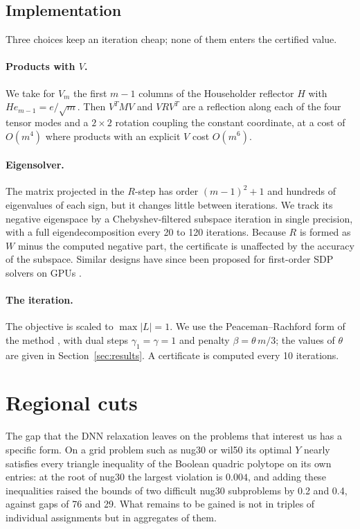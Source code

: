 \documentclass[11pt]{article}
\theoremstyle{remark}
\begin{document}
\subsection{Implementation}\label{sec:impl}

Three choices keep an iteration cheap; none of them enters the certified value.

\paragraph{Products with $V$.} We take for $V_m$ the first $m-1$ columns of the
Householder reflector $H$ with $He_{m-1} = e/\sqrt m$. Then $V^TMV$ and $VRV^T$
are a reflection along each of the four tensor modes and a $2\times2$ rotation
coupling the constant coordinate, at a cost of $O(m^4)$ where products with an
explicit $V$ cost $O(m^6)$.

\paragraph{Eigensolver.} The matrix projected in the $R$-step has order
$(m-1)^2+1$ and hundreds of eigenvalues of each sign, but it changes little
between iterations. We track its negative eigenspace by a Chebyshev-filtered
subspace iteration in single precision, with a full eigendecomposition every 20
to 120 iterations. Because $R$ is formed as $W$ minus the computed negative
part, the certificate is unaffected by the accuracy of the subspace. Similar
designs have since been proposed for first-order SDP solvers on GPUs
\cite{kang,sunkang}.

\paragraph{The iteration.} The objective is scaled to $\max|L| = 1$. We use the
Peaceman--Rachford form of the method \cite{graham}, with dual steps
$\gamma_1 = \gamma = 1$ and penalty $\beta = \theta\,m/3$; the values of $\theta$
are given in Section~\ref{sec:results}. A certificate is computed every 10
iterations.

\section{Regional cuts}\label{sec:cuts}

The gap that the DNN relaxation leaves on the problems that interest us has a
specific form. On a grid problem such as nug30 or wil50 its optimal $Y$ nearly satisfies every
triangle inequality of the Boolean quadric polytope on its own entries: at the
root of nug30 the largest violation is $0.004$, and adding these inequalities
raised the bounds of two difficult nug30 subproblems by 0.2 and 0.4, against gaps
of 76 and 29. %
What remains to be gained is not in triples of individual assignments but in
aggregates of them.
\end{document}
